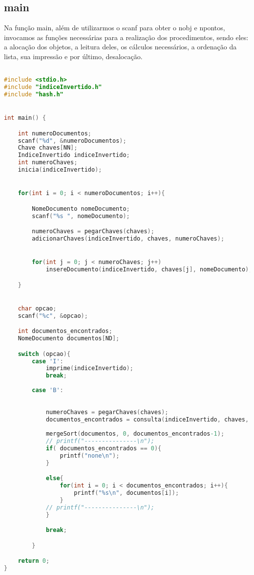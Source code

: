 \documentclass{article}
\begin{document}
\clearpage
\subsection{main}

Na função main, além de utilizarmos o scanf para obter o nobj e npontos, invocamos as funções necessárias para a realização dos procedimentos, sendo eles: a alocação dos objetos, a leitura deles, os cálculos necessários, a ordenação da lista, sua impressão e por último, desalocação.

\begin{lstlisting}[caption={Função main},label={lst:cod11},language=C]

#include <stdio.h>
#include "indiceInvertido.h"
#include "hash.h"


int main() {

    int numeroDocumentos;
    scanf("%d", &numeroDocumentos);
    Chave chaves[NN];
    IndiceInvertido indiceInvertido;
    int numeroChaves;
    inicia(indiceInvertido);


    for(int i = 0; i < numeroDocumentos; i++){

        NomeDocumento nomeDocumento;
        scanf("%s ", nomeDocumento);

        numeroChaves = pegarChaves(chaves);
        adicionarChaves(indiceInvertido, chaves, numeroChaves);


        for(int j = 0; j < numeroChaves; j++)
            insereDocumento(indiceInvertido, chaves[j], nomeDocumento);

    }


    char opcao;
    scanf("%c", &opcao);

    int documentos_encontrados;
    NomeDocumento documentos[ND];

    switch (opcao){
        case 'I':
            imprime(indiceInvertido);
            break;
        
        case 'B':
            
            
            numeroChaves = pegarChaves(chaves);
            documentos_encontrados = consulta(indiceInvertido, chaves, numeroChaves,documentos);
            
            mergeSort(documentos, 0, documentos_encontrados-1);
            // printf("---------------\n");
            if( documentos_encontrados == 0){
                printf("none\n");
            }

            else{
                for(int i = 0; i < documentos_encontrados; i++){
                    printf("%s\n", documentos[i]);
                }
            // printf("---------------\n");
            }

            break;

        }

    return 0;
}

\end{lstlisting}
\end{document}
